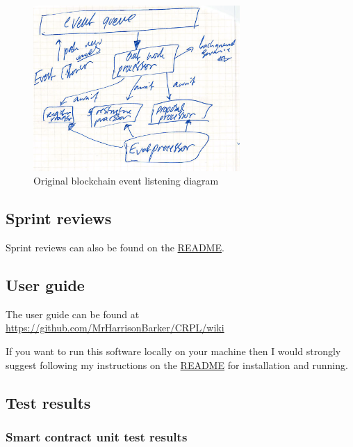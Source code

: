 \begin{figure}[H]
\caption{Original blockchain event listening diagram}
\centering
\includegraphics[width=0.7\textwidth,height=\textheight,keepaspectratio]{images/appendix/design/docs/event}
\end{figure}

\subsection{Sprint reviews}

Sprint reviews can also be found on the \href{https://github.com/mrharrisonbarker/crpl#readme}{README}.



\subsection{User guide}

The user guide can be found at \href{https://github.com/MrHarrisonBarker/CRPL/wiki}{https://github.com/MrHarrisonBarker/CRPL/wiki}

If you want to run this software locally on your machine then I would strongly suggest following my instructions on the \href{https://github.com/MrHarrisonBarker/CRPL#readme}{README} for installation and running.

\subsection{Test results}
\label{sec:test-results}

\subsubsection{Smart contract unit test results}
\label{sec:test-results:smart}

